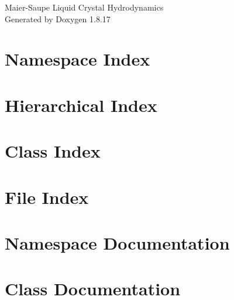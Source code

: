 \let\mypdfximage\pdfximage\def\pdfximage{\immediate\mypdfximage}\documentclass[twoside]{book}
\newcommand{\+}{\discretionary{\mbox{\scriptsize$\hookleftarrow$}}{}{}}
\newcommand{\clearemptydoublepage}{%
  \newpage{\pagestyle{empty}\cleardoublepage}%
}
\begin{document}
\hypersetup{pageanchor=false,
             bookmarksnumbered=true,
             pdfencoding=unicode
            }
\begin{titlepage}
\vspace*{7cm}
\begin{center}%
{\Large Maier-\/\+Saupe Liquid Crystal Hydrodynamics }\\
\vspace*{1cm}
{\large Generated by Doxygen 1.8.17}\\
\end{center}
\end{titlepage}
\clearemptydoublepage
{}
\tableofcontents
\clearemptydoublepage
{}
\hypersetup{pageanchor=true}

\chapter{Namespace Index}

\chapter{Hierarchical Index}

\chapter{Class Index}

\chapter{File Index}

\chapter{Namespace Documentation}





\chapter{Class Documentation}


































\end{document}
